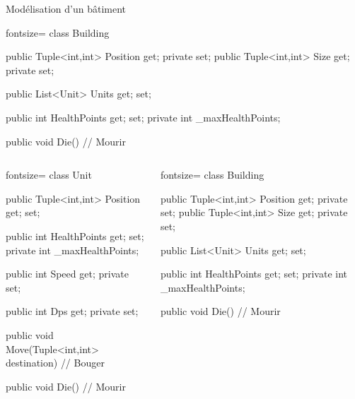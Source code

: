 \begin{frame}[fragile]
\begin{center}{\large Modélisation d'un bâtiment}\end{center}
        \begin{csharpcode*}{fontsize=\scriptsize}
class Building
{
    public Tuple<int,int> Position { get; private set; }
    public Tuple<int,int> Size { get; private set; }

    public List<Unit> Units { get; set; }

    public int HealthPoints { get; set; }
    private int _maxHealthPoints;

    public void Die()
    {
        // Mourir
    }
}
        \end{csharpcode*}
\end{frame}

\begin{frame}[fragile]
  \begin{columns}[c]
    \column{2.3in}
    \begin{csharpcode*}{fontsize=\tiny}
class Unit
{
    public Tuple<int,int> Position { get; set; }

    public int HealthPoints { get; set; }
    private int _maxHealthPoints;

    public int Speed { get; private set; }

    public int Dps { get; private set; }

    public void Move(Tuple<int,int> destination)
    {
        // Bouger
    }

    public void Die()
    {
        // Mourir
    }
}
    \end{csharpcode*}
    \column{2.5in}
    \begin{csharpcode*}{fontsize=\tiny}
class Building
{
    public Tuple<int,int> Position { get; private set; }
    public Tuple<int,int> Size { get; private set; }

    public List<Unit> Units { get; set; }

    public int HealthPoints { get; set; }
    private int _maxHealthPoints;

    public void Die()
    {
        // Mourir
    }
}
    \end{csharpcode*}
  \end{columns}
\end{frame}

